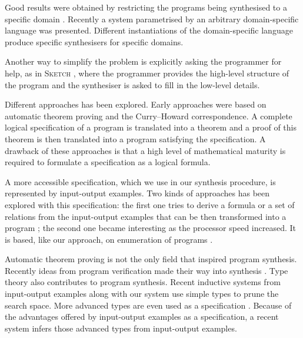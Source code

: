Good results were obtained by restricting the programs being synthesised to a specific domain \cite{Fischer:2003:ASG:967842.967845,Frigo98fftw:an,Thies2002,Gulwani:2011:ASP:1926385.1926423,Gulwani:2011:SGC:1993498.1993505}. Recently a system parametrised by an arbitrary domain-specific language \cite{Perelman:2014:TS:2594291.2594297} was presented. Different instantiations of the domain-specific language produce specific synthesisers for specific domains.

Another way to simplify the problem is explicitly asking the programmer for help, as in \textsc{Sketch} \cite{Solar-Lezama:2006:CSF:1168857.1168907}, where the programmer provides the high-level structure of the program and the synthesiser is asked to fill in the low-level details.

Different approaches has been explored.
Early approaches \cite{Manna:1980:DAP:357084.357090} were based on automatic theorem proving and the Curry–Howard correspondence. A complete logical specification of a program is translated into a theorem and a proof of this theorem is then translated into a program satisfying the specification.
A drawback of these approaches is that a high level of mathematical maturity is required to formulate a specification as a logical formula.

A more accessible specification, which we use in our synthesis procedure, is represented by input-output examples. Two kinds of approaches has been explored with this specification: the first one tries to derive a formula or a set of relations from the input-output examples that can be then transformed into a program \cite{Summers:1977:MLP:321992.322002,Kitzelmann:2009:AIF:1530575.1530582,Jha:2010:OCP:1806799.1806833}; the second one became interesting as the processor speed increased. It is based, like our approach, on enumeration of programs \cite{LambdaSquarePaper,EscherPaper,MythPaper}.

Automatic theorem proving is not the only field that inspired program synthesis. Recently ideas from program verification made their way into synthesis \cite{LeonPaper,DBLP:journals/corr/InalaQLS15,Kuncak:2010:CFS:1806596.1806632}. Type theory also contributes to program synthesis. Recent inductive systems from input-output examples \cite{LambdaSquarePaper,MythPaper} along with our system use simple types to prune the search space. More advanced types are even used as a specification \cite{SynquidPaper}. Because of the advantages offered by input-output examples as a specification, a recent system \cite{Frankle:2016:EST:2837614.2837629} infers those advanced types from input-output examples.

